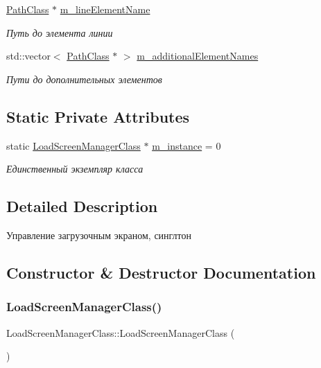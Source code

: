 \begin{DoxyCompactItemize}
\hyperlink{class_path_class}{Path\+Class} $\ast$ \hyperlink{class_load_screen_manager_class_a191caf47ba041e0eaf1b7f29d765ab39}{m\+\_\+line\+Element\+Name}
\begin{DoxyCompactList}\small\item\em Путь до элемента линии \end{DoxyCompactList}\item 
std\+::vector$<$ \hyperlink{class_path_class}{Path\+Class} $\ast$ $>$ \hyperlink{class_load_screen_manager_class_a007ed034708915f51438d7e11b66a43a}{m\+\_\+additional\+Element\+Names}
\begin{DoxyCompactList}\small\item\em Пути до дополнительных элементов \end{DoxyCompactList}\end{DoxyCompactItemize}
\subsection*{Static Private Attributes}
\begin{DoxyCompactItemize}
\item 
static \hyperlink{class_load_screen_manager_class}{Load\+Screen\+Manager\+Class} $\ast$ \hyperlink{class_load_screen_manager_class_a47f425e60a0606327ebc08ad90ccf7d6}{m\+\_\+instance} = 0
\begin{DoxyCompactList}\small\item\em Единственный экземпляр класса \end{DoxyCompactList}\end{DoxyCompactItemize}


\subsection{Detailed Description}
Управление загрузочным экраном, синглтон 

\subsection{Constructor \& Destructor Documentation}
\mbox{\label{class_load_screen_manager_class_a2e7a755a0176b52eaab4bb531747e788}} 
\subsubsection{\texorpdfstring{Load\+Screen\+Manager\+Class()}{LoadScreenManagerClass()}\hspace{0.1cm}{\footnotesize\ttfamily [1/2]}}
{\footnotesize\ttfamily Load\+Screen\+Manager\+Class\+::\+Load\+Screen\+Manager\+Class (\begin{DoxyParamCaption}{ }\end{DoxyParamCaption})\hspace{0.3cm}{\ttfamily [private]}}

